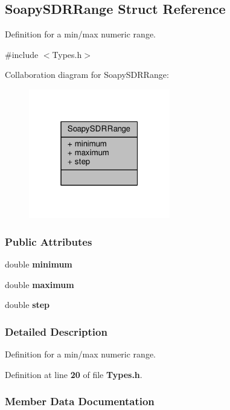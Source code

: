 \subsection{Soapy\+S\+D\+R\+Range Struct Reference}
\label{structSoapySDRRange}


Definition for a min/max numeric range.  




{\ttfamily \#include $<$Types.\+h$>$}



Collaboration diagram for Soapy\+S\+D\+R\+Range\+:
\nopagebreak
\begin{figure}[H]
\begin{center}
\leavevmode
\includegraphics[width=175pt]{d7/ddd/structSoapySDRRange__coll__graph}
\end{center}
\end{figure}
\subsubsection*{Public Attributes}
\begin{DoxyCompactItemize}
\item 
double {\bf minimum}
\item 
double {\bf maximum}
\item 
double {\bf step}
\end{DoxyCompactItemize}


\subsubsection{Detailed Description}
Definition for a min/max numeric range. 

Definition at line {\bf 20} of file {\bf Types.\+h}.



\subsubsection{Member Data Documentation}
